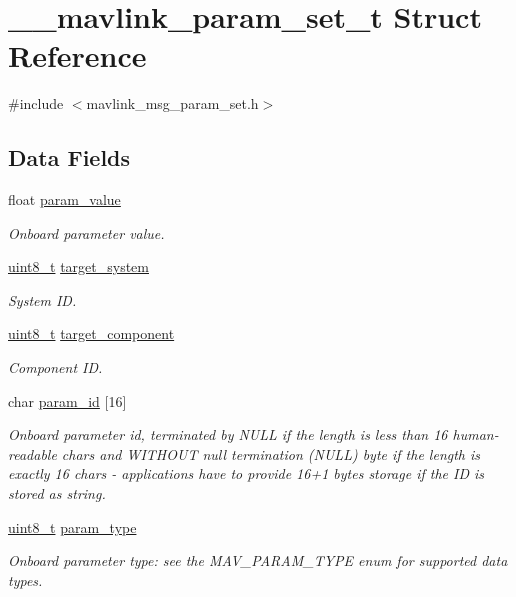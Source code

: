 \hypertarget{struct____mavlink__param__set__t}{\section{\-\_\-\-\_\-mavlink\-\_\-param\-\_\-set\-\_\-t Struct Reference}
\label{struct____mavlink__param__set__t}
}


{\ttfamily \#include $<$mavlink\-\_\-msg\-\_\-param\-\_\-set.\-h$>$}

\subsection*{Data Fields}
\begin{DoxyCompactItemize}
\item 
float \hyperlink{struct____mavlink__param__set__t_a210adccaf668137e5f083c825804276e}{param\-\_\-value}
\begin{DoxyCompactList}\small\item\em Onboard parameter value. \end{DoxyCompactList}\item 
\hyperlink{stdint_8h_aba7bc1797add20fe3efdf37ced1182c5}{uint8\-\_\-t} \hyperlink{struct____mavlink__param__set__t_a501eee1b0a93fa7affad440d51bbab90}{target\-\_\-system}
\begin{DoxyCompactList}\small\item\em System I\-D. \end{DoxyCompactList}\item 
\hyperlink{stdint_8h_aba7bc1797add20fe3efdf37ced1182c5}{uint8\-\_\-t} \hyperlink{struct____mavlink__param__set__t_ad1526f09aefc29226f2362a2a0963237}{target\-\_\-component}
\begin{DoxyCompactList}\small\item\em Component I\-D. \end{DoxyCompactList}\item 
char \hyperlink{struct____mavlink__param__set__t_acfcba135c2e917f0fcf3527bf2354477}{param\-\_\-id} \mbox{[}16\mbox{]}
\begin{DoxyCompactList}\small\item\em Onboard parameter id, terminated by N\-U\-L\-L if the length is less than 16 human-\/readable chars and W\-I\-T\-H\-O\-U\-T null termination (N\-U\-L\-L) byte if the length is exactly 16 chars -\/ applications have to provide 16+1 bytes storage if the I\-D is stored as string. \end{DoxyCompactList}\item 
\hyperlink{stdint_8h_aba7bc1797add20fe3efdf37ced1182c5}{uint8\-\_\-t} \hyperlink{struct____mavlink__param__set__t_a4eb99cce0725481254d653290a06de6f}{param\-\_\-type}
\begin{DoxyCompactList}\small\item\em Onboard parameter type\-: see the M\-A\-V\-\_\-\-P\-A\-R\-A\-M\-\_\-\-T\-Y\-P\-E enum for supported data types. \end{DoxyCompactList}\end{DoxyCompactItemize}


